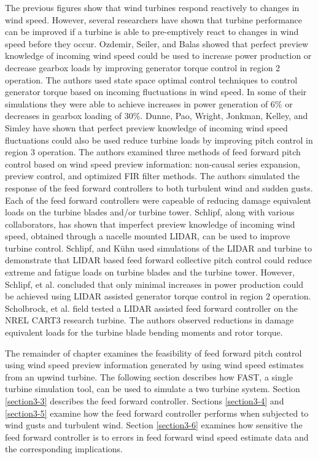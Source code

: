 The previous figures show that wind turbines respond reactively to changes in wind speed. However, several researchers have shown that turbine performance can be improved if a turbine is able to pre-emptively react to changes in wind speed before they occur. Ozdemir, Seiler, and Balas showed that perfect preview knowledge of incoming wind speed could be used to increase power production or decrease gearbox loads by improving generator torque control in region 2 operation. The authors used state space optimal control techniques to control generator torque based on incoming fluctuations in wind speed. In some of their simulations they were able to achieve increases in power generation of 6\% or decreases in gearbox loading of 30\%.\cite{ozdemir2013} Dunne, Pao, Wright, Jonkman, Kelley, and Simley have shown that perfect preview knowledge of incoming wind speed fluctuations could also be used reduce turbine loads by improving pitch control in region 3 operation. The authors examined three methods of feed forward pitch control based on wind speed preview information: non-causal series expansion, preview control, and optimized FIR filter methods. The authors simulated the response of the feed forward controllers to both turbulent wind and sudden gusts. Each of the feed forward controllers were capeable of reducing damage equivalent loads on the turbine blades and/or turbine tower.\cite{dunne2011} Schlipf, along with various collaborators, has shown that imperfect preview knowledge of incoming wind speed, obtained through a nacelle mounted LIDAR, can be used to improve turbine control.\cite{schlipf2008,schlipf2010,schlipf2011,schlipf2011a,schlipf2013} Schlipf, and K{\"u}hn used simulations of the LIDAR and turbine to demonstrate that LIDAR based feed forward collective pitch control could reduce extreme and fatigue loads on turbine blades and the turbine tower.\cite{schlipf2013} However, Schlipf, et al. concluded that only minimal increases in power production could be achieved using LIDAR assisted generator torque control in region 2 operation.\cite{schlipf2011a}  Scholbrock, et al. field tested a LIDAR assisted feed forward controller on the NREL CART3 research turbine. The authors observed reductions in damage equivalent loads for the turbine blade bending moments and rotor torque.\cite{scholbrock2013}

The remainder of chapter examines the feasibility of feed forward pitch control using wind speed preview information generated by using wind speed estimates from an upwind turbine. The following section describes how FAST, a single turbine simulation tool, can be used to simulate a two turbine system. Section \ref{section3-3} describes the feed forward controller. Sections \ref{section3-4} and \ref{section3-5} examine how the feed forward controller performs when subjected to wind gusts and turbulent wind. Section \ref{section3-6} examines how sensitive the feed forward controller is to errors in feed forward wind speed estimate data and the corresponding implications.



